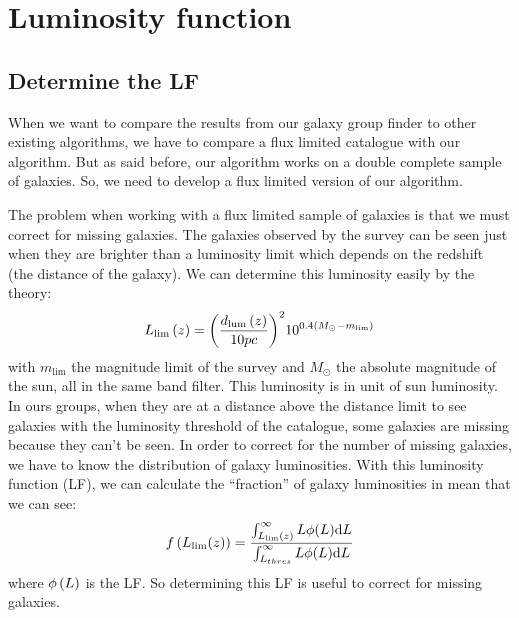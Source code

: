 \chapter{Luminosity function}
%
\section{Determine the LF}
%

When we want to compare the results from our galaxy group finder to other
existing algorithms, we have to compare a flux limited catalogue with our
algorithm. But as said before, our algorithm works on a double complete sample
of galaxies. So, we need to develop a flux limited version of our algorithm.

The problem when working with a flux limited sample of galaxies is that we must
correct for missing galaxies. The galaxies observed by the survey can be seen
just when they are brighter than a luminosity limit which depends on the
redshift (the distance of the galaxy). We can determine this luminosity easily
by the theory:
%
\begin{equation}
    L_{\lim}\left({z}\right)={{\left(\frac{d_{\rm{lum}}\left({z}\right)}{10pc}\right)}^2}10^{0.4\left({M_{\odot}-m_{\lim}}\right)}
\end{equation}
%
with $m_{\mathrm{\lim}}$ the magnitude limit of the survey and $M_{\odot}$ the
absolute magnitude of the sun, all in the same band filter. This luminosity is
in unit of sun luminosity. In ours groups, when they are at a distance above
the distance limit to see galaxies with the luminosity threshold of the
catalogue, some galaxies are missing because they can't be seen. In order to
correct for the number of missing galaxies, we have to know the distribution of
galaxy luminosities. With this luminosity function (LF), we can calculate the
``fraction'' of galaxy luminosities in mean that we can see:
%
\begin{equation}\label{eq:correc}
    f\left({L_{\lim}{\left({z}\right)}}\right)=\frac{\int_{L_{\lim}\left({z}\right)}^{\infty}L\phi{\left({L}\right)}{\rm{d}}{L}}{\int_{L_{thres}}^{\infty}L\phi{\left({L}\right)}{\rm{d}}{L}}
\end{equation}
%
where $\phi\left({L}\right)$ is the LF\@. So determining this LF is useful to correct
for missing galaxies.

